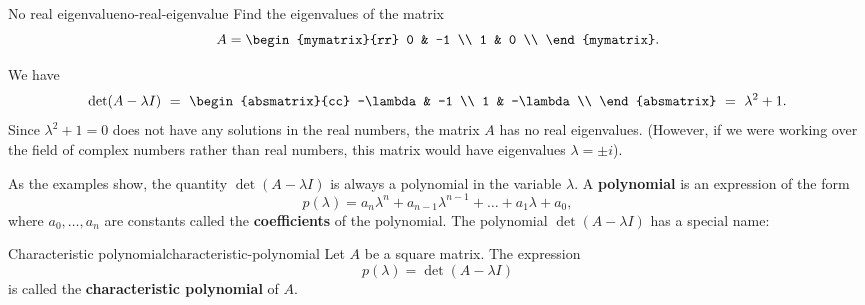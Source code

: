 \begin{example}{No real eigenvalue}{no-real-eigenvalue}
  Find the eigenvalues of the matrix
  \begin{equation*}
    A=\begin{mymatrix}{rr}
      0 & -1 \\
      1 &  0 \\
    \end{mymatrix}.
  \end{equation*}
\end{example}

\begin{solution}
  We have
  \begin{equation*}
    \det(A-\lambda I)
    ~=~
        \begin{absmatrix}{cc}
          -\lambda & -1 \\
          1 & -\lambda \\
        \end{absmatrix} \\
    ~=~
        \lambda^2 + 1.
  \end{equation*}
  Since $\lambda^2+1 = 0$ does not have any solutions in the real
  numbers, the matrix $A$ has no real eigenvalues. (However, if we
  were working over the field of complex numbers rather than real
  numbers, this matrix would have eigenvalues $\lambda=\pm i$).
\end{solution}

As the examples show, the quantity $\det(A-\lambda I)$ is always a
polynomial in the variable $\lambda$. A \textbf{polynomial}%
 is an expression of the form
\begin{equation*}
  p(\lambda) = a_n\lambda^n + a_{n-1}\lambda^{n-1} + \ldots + a_1\lambda + a_0,
\end{equation*}
where $a_0,\ldots,a_n$ are constants called the \textbf{coefficients}
of the polynomial. The polynomial $\det(A-\lambda I)$ has a special
name:

\begin{definition}{Characteristic polynomial}{characteristic-polynomial}
  Let $A$ be a square matrix. The expression
  \begin{equation*}
    p(\lambda) = \det(A-\lambda I)
  \end{equation*}
  is called the \textbf{characteristic polynomial}%
   of $A$.
\end{definition}

